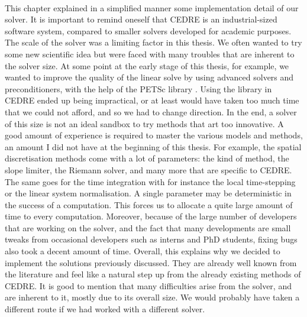   \paragraph{}
  This chapter explained in a simplified manner some implementation detail of our solver.
  It is important to remind oneself that CEDRE is an industrial-sized software system, compared to smaller solvers developed for academic purposes.
  The scale of the solver was a limiting factor in this thesis.
  We often wanted to try some new scientific idea but were faced with many troubles that are inherent to the solver size.
  At some point at the early stage of this thesis, for example, we wanted to improve the quality of the linear solve by using advanced solvers and preconditioners, with the help of the PETSc library \cite{petsc-web-page, petsc-user-ref, petsc-efficient}.
  Using the library in CEDRE ended up being impractical, or at least would have taken too much time that we could not afford, and so we had to change direction.
  In the end, a solver of this size is not an ideal sandbox to try methods that art too innovative.
  A good amount of experience is required to master the various models and methods, an amount I did not have at the beginning of this thesis.
  For example, the spatial discretisation methods come with a lot of parameters: the kind of method, the slope limiter, the Riemann solver, and many more that are specific to CEDRE.
  The same goes for the time integration with for instance the local time-stepping or the linear system normalisation.
  A single parameter may be deterministic in the success of a computation.
  This forces us to allocate a quite large amount of time to every computation.
  Moreover, because of the large number of developers that are working on the solver, and the fact that many developments are small tweaks from occasional developers such as interns and PhD students, fixing bugs also took a decent amount of time.
  Overall, this explains why we decided to implement the solutions previously discussed.
  They are already well known from the literature and feel like a natural step up from the already existing methods of CEDRE.
  It is good to mention that many difficulties arise from the solver, and are inherent to it, mostly due to its overall size.
  We would probably have taken a different route if we had worked with a different solver.


